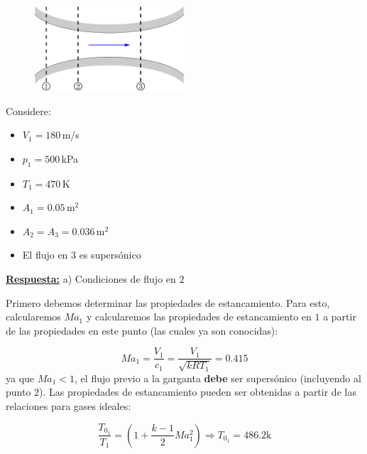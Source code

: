 \documentclass[11pt]{report}
\begin{document}
\begin{figure}[H]
\centering\includegraphics[width=0.5\textwidth]{Figures/conv_div.eps}
\caption{\label{fig:fig2} }
\end{figure}
Considere:
\begin{itemize}
\item $V_1=180$\,m/s
\item $p_1=500$\,kPa
\item $T_1=470$\,K
\item $A_1=0.05$\,m$^2$
\item $A_2=A_3=0.036$\,m$^2$
\item El flujo en $3$ es supers\'onico
\end{itemize}
\vspace{0.2cm}

\underline{\textbf{Respuesta:}}
a) Condiciones de flujo en $2$

Primero debemos determinar las propiedades de estancamiento. Para esto, calcularemos $Ma_1$ y calcularemos las propiedades de estancamiento en $1$ a partir de las propiedades en este punto (las cuales ya son conocidas):

$$
M a_{1}=\frac{V_{1}}{c_{1}}=\frac{V_{1}}{\sqrt{k R T_{1}}}=0.415
$$
ya que $Ma_1<1$, el flujo previo a la garganta \textbf{debe} ser supers\'onico (incluyendo al punto $2$). Las propiedades de estancamiento pueden ser obtenidas a partir de las relaciones para gases ideales:

$$
\frac{T_{0_1}}{T_{1}}=\left(1+\frac{k-1}{2} Ma_1^{2}\right) \Rightarrow T_{0_1}=486.2 \mathrm{k}
$$
\end{document}
